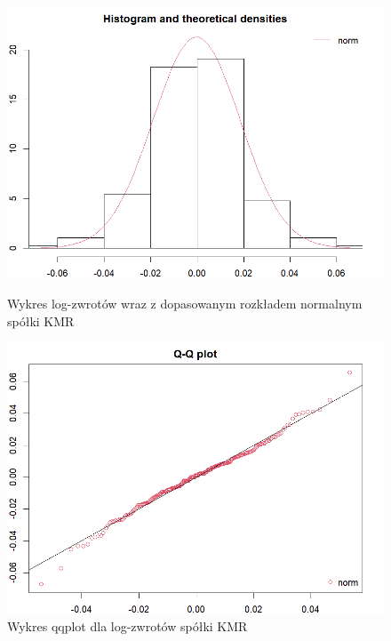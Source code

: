 \documentclass[a4paper,11pt]{article}
\begin{document}
\begin{figure}[!htb]
    \begin{minipage}{0.45\textwidth}
        \centering
        \includegraphics[width=\linewidth]{kmr_histW_log.png}
        \caption{Wykres log-zwrotów wraz z dopasowanym rozkładem normalnym spółki KMR}
        \label{fig:kmr_histwykres_log}
    \end{minipage}\hspace{0.05\textwidth}%
    \begin{minipage}{0.45\textwidth}
        \centering
        \includegraphics[width=\linewidth]{kmr_qqplot_log.png}
        \caption{Wykres qqplot dla log-zwrotów spółki KMR}
        \label{fig:kmr_qqplot_log}
    \end{minipage}


\end{figure}
\end{document}
